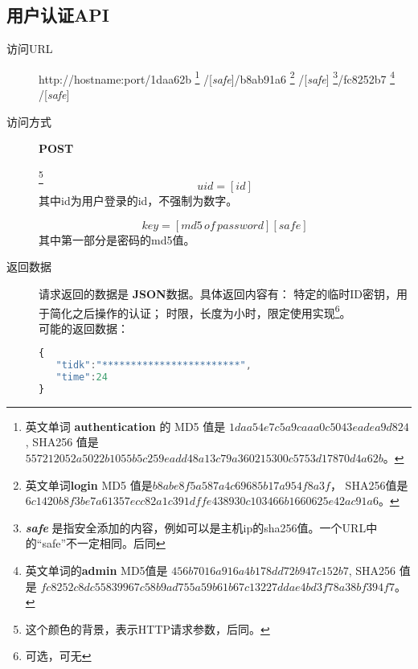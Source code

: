 \documentclass[UTF8]{article}
\def\safe{/[\textit{safe}]}
\def\POST{\colorbox[rgb]{0.77,0.53,0.97}{\textbf{POST}}}
\def\bfJSON{\textbf{JSON}}
\def\viaurl{\item[{\quad\colorbox[rgb]{0.47,0.88,0.89}{访问URL}}]}
\def\viareq#1{\item[{\quad\colorbox[rgb]{0.57,0.88,0.99}{访问方式}}] #1}
\def\rtdata{\item[{\quad\colorbox[rgb]{0.70,0.9,0.59}{返回数据}}]}
\begin{document}
    \subsection{用户认证API}%



    \begin{description}

        \viaurl http://hostname:port/1daa62b
        \footnote{
            英文单词 \textbf{authentication} 的
            MD5 值是
            $1daa54e7c5a9caaa0c5043eadea9d824$,
            SHA256 值是
            $557212052a5022b1055b5c259eadd48a13c79a360215300c5753d17870d4a62b$。
        }
        \safe/b8ab91a6
        \footnote{
            英文单词\textbf{login}  MD5 值是$b8abe8f5a587a4c69685b17a954f8a3f$，
            SHA256值是
            $6c1420b8f3be7a61357ecc82a1c391dffe438930c103466b1660625e42ac91a6$。
        }
        \safe
        \footnote{\textit{\textbf{safe}} 是指安全添加的内容，例如可以是主机ip的sha256值。一个URL中的“safe”不一定相同。后同}/fc8252b7
        \footnote{
            英文单词的\textbf{admin} 
            MD5值是 $456b7016a916a4b178dd72b947c152b7 $,
            SHA256 值是
            $fc8252c8dc55839967c58b9ad755a59b61b67c13227ddae4bd3f78a38bf394f7$。
        }
        \safe

        \viareq \POST

        \label{par:id}
        \footnote{这个颜色的背景，表示HTTP请求参数，后同。}
        $$uid=[id]$$
        其中id为用户登录的id，不强制为数字。

        \label{par:key}
         $$key=[md5\, of\, password][safe]$$
         其中第一部分是密码的md5值。

        \rtdata 请求返回的数据是 \bfJSON 数据。具体返回内容有：
        特定的临时ID密钥，用于简化之后操作的认证；
        时限，长度为小时，限定使用实现\footnote{可选，可无}。
         \\ 可能的返回数据：
        \begin{lstlisting}[language=JavaScript]
{
   "tidk":"************************",
   "time":24
}
        \end{lstlisting}


    \end{description}
\end{document}
